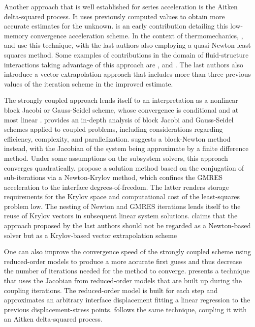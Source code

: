 Another approach that is well established for series acceleration is the Aitken delta-squared process.
It uses previously computed values to obtain more accurate estimates for the unknown.
\cite{irons_version_1969} is an early contribution detailing this low-memory convergence acceleration scheme.
In the context of thermomechanics, \cite{danowski_computational_2014}, \cite{erbts_partitioned_2015} and \cite{wendt_partitioned_2015} use this technique, with the last authors also employing a quasi-Newton least squares method.
Some examples of contributions in the domain of fluid-structure interactions taking advantage of this approach are \cite{degroote_stability_2008}, \cite{kuttler_fixed-point_2008} and \cite{kuttler_vector_2009}.
The last authors also introduce a vector extrapolation approach that includes more than three previous values of the iteration scheme in the improved estimate.

The strongly coupled approach lends itself to an interpretation as a nonlinear block Jacobi or Gauss-Seidel scheme, whose convergence is conditional and at most linear \citep{matthies_strong_2003, joosten_analysis_2009}.
\cite{cervera_computational_1996} provides an in-depth analysis of block Jacobi and Gauss-Seidel schemes applied to coupled problems, including considerations regarding efficiency, complexity, and parallelization.
\cite{matthies_partitioned_2003, matthies_strong_2003} suggests a block-Newton method instead, with the Jacobian of the system being approximate by a finite difference method.
Under some assumptions on the subsystem solvers, this approach converges quadratically.
\cite{michler_interface_2005} propose a solution method based on the conjugation of sub-iterations via a Newton-Krylov method, which confines the GMRES acceleration to the interface degrees-of-freedom.
The latter renders storage requirements for the Krylov space and computational cost of the least-squares
problem low.
The nesting of Newton and GMRES iterations lends itself to the reuse of Krylov vectors in subsequent linear system solutions.
\cite{kuttler_vector_2009} claims that the approach proposed by the last authors should not be regarded as a Newton-based solver but as a Krylov-based vector extrapolation scheme

One can also improve the convergence speed of the strongly coupled scheme using reduced-order models to produce a more accurate first guess and thus decrease the number of iterations needed for the method to converge.
\cite{vierendeels_implicit_2007} presents a technique that uses the Jacobian from reduced-order models that are built up during the coupling iterations.
The reduced-order model is built for each step and approximates an arbitrary interface displacement fitting a linear regression to the previous displacement-stress points.
\cite{degroote_stability_2008} follows the same technique, coupling it with an Aitken delta-squared process.

